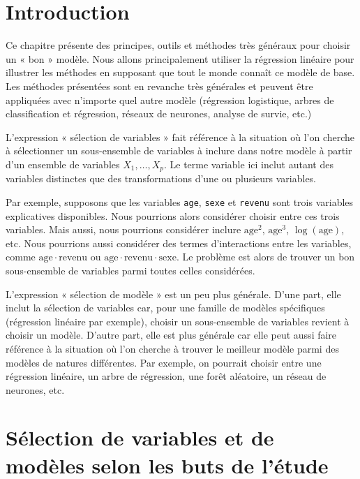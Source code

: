 \documentclass[
  11pt,
  letterpaper,
]{book}
\theoremstyle{definition}
\theoremstyle{definition}
\theoremstyle{definition}
\theoremstyle{remark}
\begin{document}
\hypertarget{introduction-3}{%
\section{Introduction}\label{introduction-3}}

Ce chapitre présente des principes, outils et méthodes très généraux pour choisir un « bon » modèle. Nous allons principalement utiliser la régression linéaire pour illustrer les méthodes en supposant que tout le monde connaît ce modèle de base. Les méthodes présentées sont en revanche très générales et peuvent être appliquées avec n'importe quel autre modèle (régression logistique, arbres de classification et régression, réseaux de neurones, analyse de survie, etc.)

L'expression « sélection de variables » fait référence à la situation où l'on cherche à sélectionner un sous-ensemble de variables à inclure dans notre modèle à partir d'un ensemble de variables \(X_1, \ldots, X_p\). Le terme variable ici inclut autant des variables distinctes que des transformations d'une ou plusieurs variables.

Par exemple, supposons que les variables \texttt{age}, \texttt{sexe} et \texttt{revenu} sont trois variables explicatives disponibles. Nous pourrions alors considérer choisir entre ces trois variables. Mais aussi, nous pourrions considérer inclure \(\mathrm{age}^2\), \(\mathrm{age}^3\), \(\log(\mathrm{age})\), etc. Nous pourrions aussi considérer des termes d'interactions entre les variables, comme \(\mathrm{age} \cdot \mathrm{revenu}\) ou \(\mathrm{age}\cdot\mathrm{revenu}\cdot\mathrm{sexe}\). Le problème est alors de trouver un bon sous-ensemble de variables parmi toutes celles considérées.

L'expression « sélection de modèle » est un peu plus générale. D'une part, elle inclut la sélection de variables car, pour une famille de modèles spécifiques (régression linéaire par exemple), choisir un sous-ensemble de variables revient à choisir un modèle. D'autre part, elle est plus générale car elle peut aussi faire référence à la situation où l'on cherche à trouver le meilleur modèle parmi des modèles de natures différentes. Par exemple, on pourrait choisir entre une régression linéaire, un arbre de régression, une forêt aléatoire, un réseau de neurones, etc.

\hypertarget{suxe9lection-de-variables-et-de-moduxe8les-selon-les-buts-de-luxe9tude}{%
\section{Sélection de variables et de modèles selon les buts de l'étude}\label{suxe9lection-de-variables-et-de-moduxe8les-selon-les-buts-de-luxe9tude}}
\end{document}
